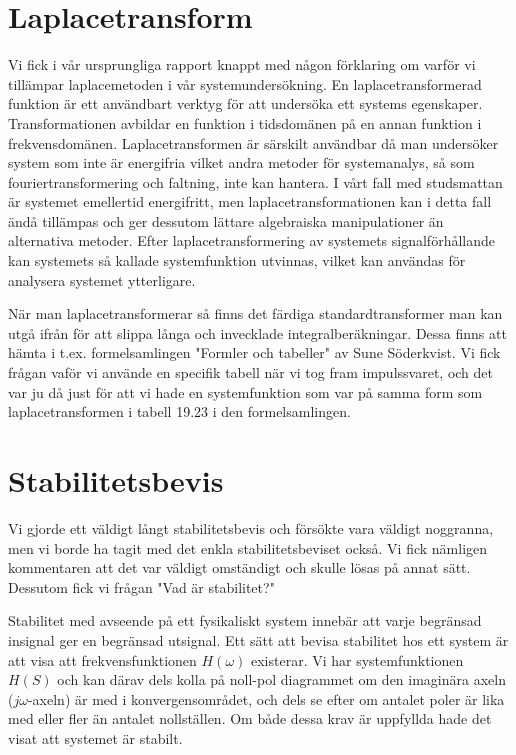 \documentclass[10pt,a4paper]{article}
\begin{document}
\section{Laplacetransform}
Vi fick i vår ursprungliga rapport knappt med någon förklaring om varför vi tillämpar laplacemetoden i vår systemundersökning. En laplacetransformerad funktion är ett användbart verktyg för att undersöka ett systems egenskaper. Transformationen avbildar en funktion i tidsdomänen på en annan funktion i frekvensdomänen. Laplacetransformen är särskilt användbar då man undersöker system som inte är energifria vilket andra metoder för systemanalys, så som fouriertransformering och faltning, inte kan hantera. I vårt fall med studsmattan är systemet emellertid energifritt, men laplacetransformationen kan i detta fall ändå tillämpas och ger dessutom lättare algebraiska manipulationer än alternativa metoder.
Efter laplacetransformering av systemets signalförhållande kan systemets så kallade systemfunktion utvinnas, vilket kan användas för analysera systemet ytterligare.

När man laplacetransformerar så finns det färdiga standardtransformer man kan utgå ifrån för att slippa långa och invecklade integralberäkningar. Dessa finns att hämta i t.ex. formelsamlingen "Formler och tabeller" av Sune Söderkvist. Vi fick frågan vaför vi använde en specifik tabell när vi tog fram impulssvaret, och det var ju då just för att vi hade en systemfunktion som var på samma form som laplacetransformen i tabell 19.23 i den formelsamlingen.

\section{Stabilitetsbevis}

Vi gjorde ett väldigt långt stabilitetsbevis och försökte vara väldigt noggranna, men vi borde ha tagit med det enkla stabilitetsbeviset också. Vi fick nämligen kommentaren att det var väldigt omständigt och skulle lösas på annat sätt. Dessutom fick vi frågan "Vad är stabilitet?"

Stabilitet med avseende på ett fysikaliskt system innebär att varje begränsad insignal ger en begränsad utsignal. Ett sätt att bevisa stabilitet hos ett system är att visa att frekvensfunktionen $H(\omega)$ existerar. Vi har systemfunktionen $H(S)$ och kan därav dels kolla på noll-pol diagrammet om den imaginära axeln ($j\omega$-axeln) är med i konvergensområdet, och dels se efter om antalet poler är lika med eller fler än antalet nollställen. Om både dessa krav är uppfyllda hade det visat att systemet är stabilt. 
\end{document}
